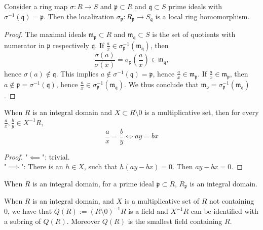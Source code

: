 \begin{lemma}
    Consider a ring map $\sigma: R\rightarrow S$ and $\mathfrak{p}\subset R$ and $\mathfrak{q}\subset S$ prime ideals with $\sigma^{-1}(\mathfrak{q})=\mathfrak{p}$. Then the localization $\sigma_\mathfrak{p}: R_\mathfrak{p}\rightarrow S_\mathfrak{q}$ is a local ring homomorphism.
\end{lemma}
\begin{proof}
    The maximal ideals $\mathfrak{m}_\mathfrak{p}\subset R$ and $\mathfrak{m}_\mathfrak{q}\subset S$ is the set of quotients with numerator in $\mathfrak{p}$ respectively $\mathfrak{q}$. If $\frac{a}{x}\in \sigma_\mathfrak{p}^{-1}(\mathfrak{m}_\mathfrak{q})$, then 
    $$
        \frac{\sigma(a)}{\sigma(x)}=\sigma_\mathfrak{p}\left(\frac{a}{x}\right)\in \mathfrak{m}_\mathfrak{q},
    $$
    hence $\sigma(a)\notin \mathfrak{q}$. This implies $a\notin \sigma^{-1}(\mathfrak{q})=\mathfrak{p}$, hence $\frac{a}{x}\in \mathfrak{m}_\mathfrak{p}$. If $\frac{a}{x}\in \mathfrak{m}_\mathfrak{p}$, then $a\notin \mathfrak{p}=\sigma^{-1}(\mathfrak{q})$, hence $\frac{a}{x}\in \sigma_\mathfrak{p}^{-1}(\mathfrak{m}_\mathfrak{q})$. We thus conclude that $\mathfrak{m}_\mathfrak{p}=\sigma_\mathfrak{p}^{-1}(\mathfrak{m}_\mathfrak{q})$. 
\end{proof}
\begin{proposition}
    When $R$ is an integral domain and $X\subset R\setminus 0$ is a multiplicative set, then for every $\frac{a}{x},\frac{b}{y}\in X^{-1}R$,
    $$
        \frac{a}{x}=\frac{b}{y} \iff ay=bx
    $$
\end{proposition}
\begin{proof}
    "$\impliedby$": trivial.\\
    "$\implies$": There is an $h\in X$, such that $h(ay-bx)=0$. Then $ay-bx=0$. 
\end{proof}
\begin{corollary}
    When $R$ is an integral domain, for a prime ideal $\mathfrak{p}\subset R$,  $R_\mathfrak{p}$ is an integral domain. 
\end{corollary}
\begin{theorem}
    When $R$ is an integral domain, and $X$ is a multiplicative set of $R$ not containing $0$, we have that $Q(R):= (R\setminus 0)^{-1}R$ is a field and $X^{-1}R$ can be identified with a subring of $Q(R)$. Moreover $Q(R)$ is the smallest field containing $R$.
\end{theorem}
